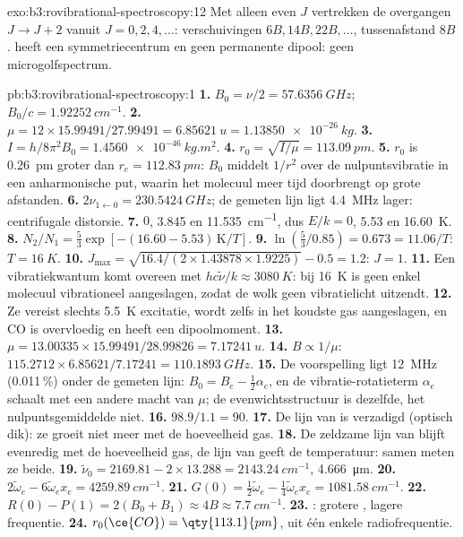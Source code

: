 \begin{solution}{exo:b3:rovibrational-spectroscopy:12}
Met alleen even $J$ vertrekken de overgangen $J \to J + 2$ vanuit $J = 0, 2, 4, \dots$: verschuivingen
$6B, 14B, 22B, \dots$, tussenafstand $8B$.  heeft een
symmetriecentrum en geen
permanente dipool: geen microgolfspectrum.
\end{solution}

\begin{solution}{pb:b3:rovibrational-spectroscopy:1}
\textbf{1.} $B_0 = \nu/2 = \qty{57.6356}{GHz}$; $B_0/c = \qty{1.92252}{cm^{-1}}$.
\textbf{2.} $\mu = 12 \times 15.99491/27.99491 = \qty{6.85621}{u} = \qty{1.13850e-26}{kg}$.
\textbf{3.} $I = h/8\pi^2B_0 = \qty{1.4560e-46}{kg.m^2}$.
\textbf{4.} $r_0 = \sqrt{I/\mu} = \qty{113.09}{pm}$.
\textbf{5.} $r_0$ is \qty{0.26}{pm} groter dan $r_e = \qty{112.83}{pm}$: $B_0$
middelt $1/r^2$
over de nulpuntsvibratie in een anharmonische put, waarin het molecuul
meer tijd doorbrengt op grote afstanden.
\textbf{6.} $2\nu_{1\leftarrow0} = \qty{230.5424}{GHz}$; de gemeten lijn ligt
\qty{4.4}{MHz} lager:
centrifugale distorsie.
\textbf{7.} $0$, 3.845 en \qty{11.535}{cm^{-1}}, dus $E/k = 0$, 5.53 en \qty{16.60}{K}.
\textbf{8.} $N_2/N_1 = \frac53\exp[-(16.60 - 5.53)\,\mathrm K/T]$.
\textbf{9.} $\ln(\frac53/0.85) = 0.673 = 11.06/T$: $T = \qty{16}{K}$.
\textbf{10.} $J_{\max} = \sqrt{16.4/(2 \times 1.43878 \times 1.9225)} - 0.5 = 1.2$: $J = 1$.
\textbf{11.} Een vibratiekwantum komt overeen met $hc\tilde\nu/k \approx \qty{3080}{K}$: bij
\qty{16}{K} is geen enkel molecuul vibrationeel aangeslagen, zodat de wolk
geen vibratielicht uitzendt.
\textbf{12.} Ze vereist slechts \qty{5.5}{K} excitatie, wordt zelfs in het
koudste gas aangeslagen, en CO is overvloedig en heeft een dipoolmoment.
\textbf{13.} $\mu = 13.00335 \times 15.99491/28.99826 = \qty{7.17241}{u}$.
\textbf{14.} $B \propto 1/\mu$: $115.2712 \times 6.85621/7.17241 = \qty{110.1893}{GHz}$.
\textbf{15.} De voorspelling ligt \qty{12}{MHz} (0.011\,\%) onder de gemeten
lijn: $B_0 = B_e - \frac12\alpha_e$, en de
vibratie-rotatieterm $\alpha_e$ schaalt met een andere macht van $\mu$; de
evenwichtsstructuur is dezelfde, het nulpuntsgemiddelde niet.
\textbf{16.} $98.9/1.1 = 90$.
\textbf{17.} De lijn van  is verzadigd (optisch dik): ze
groeit niet meer met de hoeveelheid gas.
\textbf{18.} De zeldzame lijn van  blijft evenredig met de
hoeveelheid gas, de lijn van
 geeft de temperatuur: samen meten ze beide.
\textbf{19.} $\tilde\nu_0 = 2169.81 - 2 \times 13.288 = \qty{2143.24}{cm^{-1}}$, \qty{4.666}{\micro m}.
\textbf{20.} $2\tilde\omega_e - 6\tilde\omega_ex_e = \qty{4259.89}{cm^{-1}}$.
\textbf{21.} $G(0) = \frac12\tilde\omega_e - \frac14\tilde\omega_ex_e = \qty{1081.58}{cm^{-1}}$.
\textbf{22.} $R(0) - P(1) = 2(B_0 + B_1) \approx 4B \approx \qty{7.7}{cm^{-1}}$.
\textbf{23.} : grotere , lagere frequentie.
\textbf{24.} \textbf{$r_0(\ce{CO}) = \qty{113.1}{pm}$}, uit één enkele radiofrequentie.
\end{solution}
